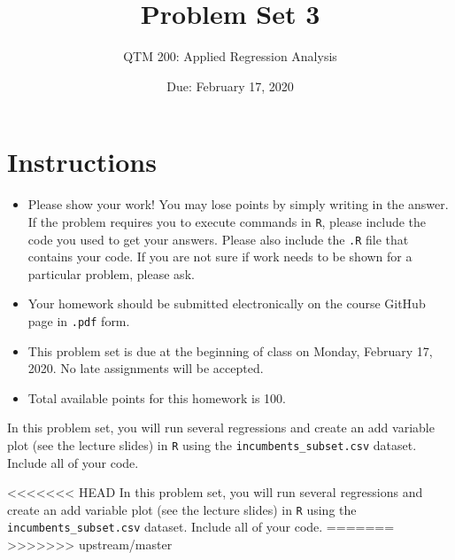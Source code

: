 \documentclass[12pt,letterpaper]{article}
\title{Problem Set 3}
\date{Due: February 17, 2020}
\author{QTM 200: Applied Regression Analysis}
\begin{document}
	\maketitle
	
	\section*{Instructions}
	\begin{itemize}
		\item Please show your work! You may lose points by simply writing in the answer. If the problem requires you to execute commands in \texttt{R}, please include the code you used to get your answers. Please also include the \texttt{.R} file that contains your code. If you are not sure if work needs to be shown for a particular problem, please ask.
		\item Your homework should be submitted electronically on the course GitHub page in \texttt{.pdf} form.
		\item This problem set is due at the beginning of class on Monday, February 17, 2020. No late assignments will be accepted.
		\item Total available points for this homework is 100.
	\end{itemize}
	
	\vspace{.25cm}
	
	\noindent In this problem set, you will run several regressions and create an add variable plot (see the lecture slides) in \texttt{R} using the \texttt{incumbents\_subset.csv} dataset. Include all of your code.
	
<<<<<<< HEAD
\noindent In this problem set, you will run several regressions and create an add variable plot (see the lecture slides) in \texttt{R} using the \texttt{incumbents\_subset.csv} dataset. Include all of your code.
\label{key}
=======
>>>>>>> upstream/master
	\vspace{.5cm}
\end{document}

